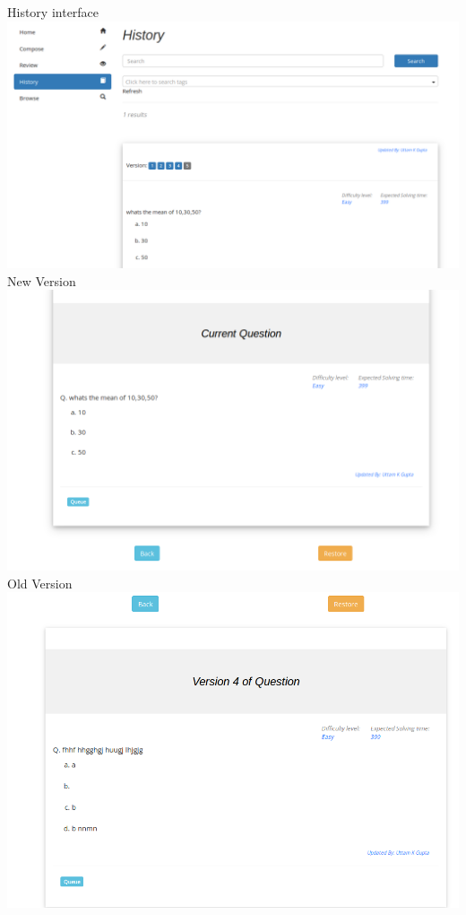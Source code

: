 \documentclass[a4paper,12pt,oneside]{book}
\begin{document}
History interface\\
\includegraphics[scale=0.3]{history.png}	\\

New Version \\
\includegraphics[scale=0.4]{version1.png}	\\

Old Version\\
\includegraphics[scale=0.4]{version3.png}	\\
\end{document}

